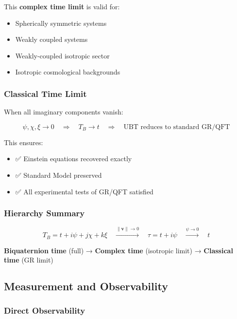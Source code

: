 This \textbf{complex time limit} is valid for:
\begin{itemize}
    \item Spherically symmetric systems
    \item Weakly coupled systems
    \item Weakly-coupled isotropic sector
    \item Isotropic cosmological backgrounds
\end{itemize}

\subsubsection{Classical Time Limit}

When all imaginary components vanish:

\begin{equation}
\label{eq:canonical:real_limit}
\psi, \chi, \xi \to 0 \quad \Rightarrow \quad T_B \to t \quad \Rightarrow \quad \text{UBT reduces to standard GR/QFT}
\end{equation}

This ensures:
\begin{itemize}
    \item ✅ Einstein equations recovered exactly
    \item ✅ Standard Model preserved
    \item ✅ All experimental tests of GR/QFT satisfied
\end{itemize}

\subsubsection{Hierarchy Summary}

\begin{equation}
\boxed{T_B = t + i\psi + j\chi + k\xi \quad \xrightarrow{\|\mathbf{v}\| \to 0} \quad \tau = t + i\psi \quad \xrightarrow{\psi \to 0} \quad t}
\end{equation}

\textbf{Biquaternion time} (full) → \textbf{Complex time} (isotropic limit) → \textbf{Classical time} (GR limit)

\subsection{Measurement and Observability}

\subsubsection{Direct Observability}


